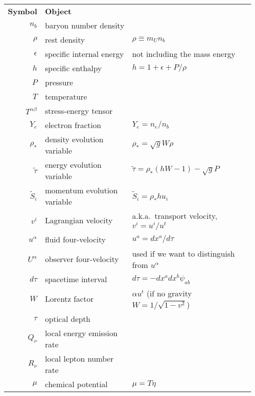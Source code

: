 \begin{table}
  \centering
  \begin{tabular}{rll}
    \textbf{Symbol}       & \textbf{Object}           & \\%
    $n_b$                 & baryon number density     & \\
    $\rho$                & rest density              & $\rho \equiv m_U n_b $ \\
    $\epsilon$            & specific internal energy  & not including the mass energy \\
    $h$                   & specific enthalpy         & $h=1+\epsilon+P/\rho$\\
    $P$                   & pressure                  & \\
    $T$                   & temperature               & \\
    $T^{\alpha \beta}$    & stress-energy tensor      & \\
    $Y_e$                 & electron fraction         & $Y_e=n_e/n_b$\\
    $\rho_*$              & density evolution variable& $\rho_*=\sqrt{g}W\rho$ \\
    $\tilde\tau$          & energy evolution variable & $\tilde\tau=\rho_*(hW-1)-\sqrt{g}P$ \\
    $\tilde S_i$          & momentum evolution variable & $\tilde S_i=\rho_*hu_i$\\
    $v^i$                 & Lagrangian velocity       & a.k.a.\ transport velocity, $v^i=u^i/u^t$ \\
    $u^\alpha$            & fluid four-velocity       & $u^a=dx^a/d\tau$ \\
    $U^\alpha$            & observer four-velocity    & used if we want to distinguish from $u^\alpha$ \\
    $d\tau$               & spacetime interval        & $d\tau=-dx^a dx^b \psi_{ab}$ \\
    $W$                   & Lorentz factor            & $\alpha u^t$ (if no gravity $W=1/\sqrt{1-v^2}$) \\
    $\tau$                & optical depth             & \\
    $Q_\nu$               & local energy emission rate& \\
    $R_\nu$               & local lepton number rate  & \\
    $\mu$                 & chemical potential        & $\mu=T\eta$ \\

\end{tabular}
\end{table}
